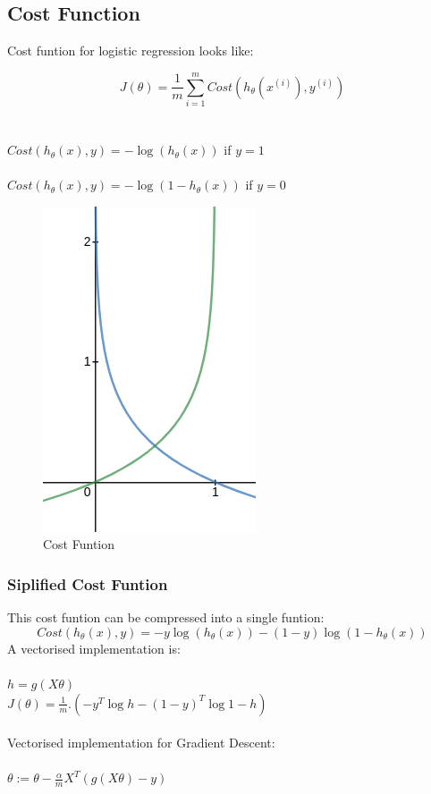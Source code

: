 \documentclass[12pt]{report}
\begin{document}
  \subsection{Cost Function}
    Cost funtion for logistic regression looks like:

    \begin{equation}
      J(\theta) = \frac{1}{m}\sum_{i=1}^{m}Cost(h_\theta(x^{(i)}), y^{(i)})
    \end{equation}
    \\ \\
    $ Cost(h_\theta(x),y) = -\log{(h_\theta{(x)})} $ \hfill if $y = 1$
    \\ \\
    $Cost(h_\theta(x),y) = -\log{(1-h_\theta{(x)})}$  \hfill if $y = 0$

    \begin{figure}[h]
      \centering
      \includegraphics[scale = 0.25]{costlog.png}
      \caption{Cost Funtion}
    \end{figure}

    \subsubsection{Siplified Cost Funtion}
    This cost funtion can be compressed into a single funtion:
    \begin{equation}
      Cost(h_\theta(x),y) = -y\log{(h_\theta{(x)})} -(1-y)\log{(1-h_\theta{(x)})}
    \end{equation}
    A vectorised implementation is: \\ \\
    $h = g(X\theta)$\\
    $J(\theta) = \frac{1}{m}.(-y^T\log{h}-(1-y)^T\log{1-h})$
    \\ \\
    Vectorised implementation for Gradient Descent: \\ \\
    $\theta := \theta - \frac{\alpha}{m}X^T(g(X\theta)-y)$
\end{document}
